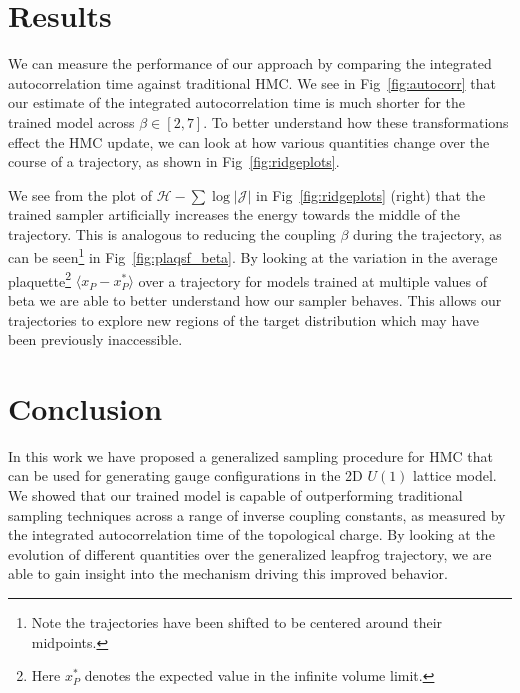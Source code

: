 \documentclass[a4paper,11pt]{article}
\begin{document}
%
%
\section{\label{sec:results}Results}
We can measure the performance of our approach by comparing the integrated
autocorrelation time against traditional HMC.
%
We see in Fig~\ref{fig:autocorr} that our estimate of the integrated
autocorrelation time is much shorter for the trained model across \(\beta \in
[2, 7]\).
%
To better understand how these transformations effect the HMC update, we can
look at how various quantities change over the course of a trajectory, as shown
in Fig~\ref{fig:ridgeplots}.
%

We see from the plot of \(\mathcal{H} - \sum \log | \mathcal{J} |\) in
Fig~\ref{fig:ridgeplots} (right) that the trained sampler artificially
increases the energy towards the middle of the trajectory.
%
This is analogous to reducing the coupling \(\beta\) during the trajectory, as
can be seen\footnote{%
    Note the trajectories have been shifted to be centered around their
    midpoints.
} in Fig~\ref{fig:plaqsf_beta}.
%
By looking at the variation in the average plaquette\footnote{%
    Here \(x^{\ast}_{P}\) denotes the expected value in the infinite volume limit.
} \(\langle x_{P} - x^{\ast}_{P}\rangle\) over a trajectory for models trained
at multiple values of beta we are able to better understand how our sampler
behaves.
%
This allows our trajectories to explore new regions of the target distribution
which may have been previously inaccessible.
%
\section{\label{sec:conclusion}Conclusion}
%
In this work we have proposed a generalized sampling procedure for HMC that can
be used for generating gauge configurations in the 2D \(U(1)\) lattice model.
%
We showed that our trained model is capable of outperforming traditional
sampling techniques across a range of inverse coupling constants, as measured
by the integrated autocorrelation time of the topological charge.
%
By looking at the evolution of different quantities over the generalized
leapfrog trajectory, we are able to gain insight into the mechanism driving
this improved behavior.
%
\end{document}
